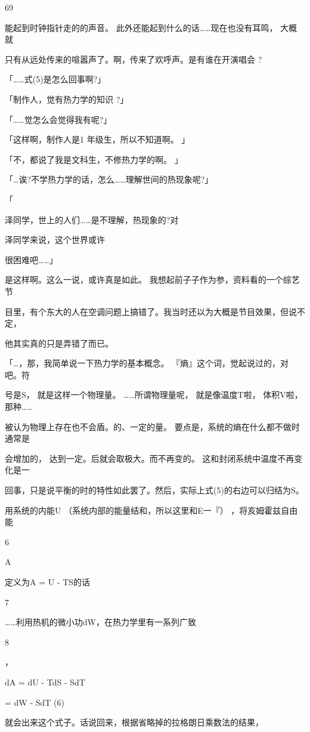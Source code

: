 69\par
能起到时钟指针走的的声音。 此外还能起到什么的话……现在也没有耳鸣， 大概就\par
只有从远处传来的喧嚣声了。啊，传来了欢呼声。是有谁在开演唱会 ?\par
「……式(5)是怎么回事啊?」\par
「制作人，觉有热力学的知识 ?」\par
「……觉怎么会觉得我有呢?」\par
「这样啊，制作人是1 年级生，所以不知道啊。 」\par
「不，都说了我是文科生，不修热力学的啊。 」\par
「…诶?不学热力学的话，怎么……理解世间的热现象呢?」\par
「\par
泽同学，世上的人们……是不理解，热现象的?对\par
泽同学来说，这个世界或许\par
很困难吧……」\par
是这样啊。这么一说，或许真是如此。 我想起前子子作为参，资料看的一个综艺节\par
目里，有个东大的人在空调问题上搞错了。我当时还以为大概是节目效果，但说不定，\par
他其实真的只是弄错了而已。\par
「…，那，我简单说一下热力学的基本概念。 『熵』这个词，觉起说过的，对吧。符\par
号是S， 就是这样一个物理量。 ……所谓物理量呢， 就是像温度T啦， 体积V啦， 那种……\par
被认为物理上存在也不会盾。的、一定的量。 要点是，系统的熵在什么都不做时通常是\par
会增加的， 达到一定。后就会取极大。而不再变的。 这和封闭系统中温度不再变化是一\par
回事，只是说平衡的时的特性如此罢了。然后，实际上式(5)的右边可以归结为S。\par
用系统的内能U （系统内部的能量结和，所以这里和E一『） ，将亥姆霍兹自由能\par
6\par
A\par
定义为A = U - TS的话\par
7\par
……利用热机的微小功dW，在热力学里有一系列广致\par
8\par
，\par
dA = dU - TdS - SdT\par
= dW - SdT (6)\par
就会出来这个式子。话说回来，根据省略掉的拉格朗日乘数法的结果，\par
